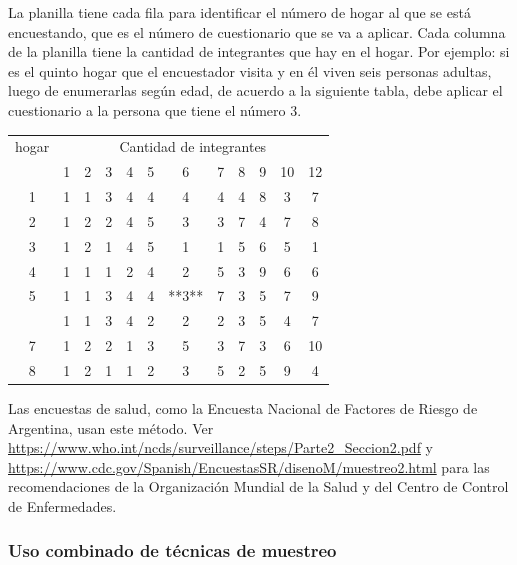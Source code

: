 \documentclass[]{article}
\begin{document}
La planilla tiene cada fila para identificar el número de hogar al que se está encuestando, que es el número de cuestionario que se va a aplicar. Cada columna de la planilla tiene la cantidad de integrantes que hay en el hogar. Por ejemplo: si es el quinto hogar que el encuestador visita y en él viven seis personas adultas, luego de enumerarlas según edad, de acuerdo a la siguiente tabla, debe aplicar el cuestionario a la persona que tiene el número 3.

\begin{table}[H]
\centering
\begin{tabular}{cccccccccccc}
\toprule
\multicolumn{1}{c}{hogar} & \multicolumn{11}{c}{Cantidad de integrantes} \\
\cmidrule(l{3pt}r{3pt}){1-1} \cmidrule(l{3pt}r{3pt}){2-12}
 & 1 & 2 & 3 & 4 & 5 & 6 & 7 & 8 & 9 & 10 & 12\\
\midrule
\rowcolor{gray!6}  1 & 1 & 1 & 3 & 4 & 4 & 4 & 4 & 4 & 8 & 3 & 7\\
2 & 1 & 2 & 2 & 4 & 5 & 3 & 3 & 7 & 4 & 7 & 8\\
\rowcolor{gray!6}  3 & 1 & 2 & 1 & 4 & 5 & 1 & 1 & 5 & 6 & 5 & 1\\
4 & 1 & 1 & 1 & 2 & 4 & 2 & 5 & 3 & 9 & 6 & 6\\
\rowcolor{gray!6}  5 & 1 & 1 & 3 & 4 & 4 & **3** & 7 & 3 & 5 & 7 & 9\\
\addlinespace
6 & 1 & 1 & 3 & 4 & 2 & 2 & 2 & 3 & 5 & 4 & 7\\
\rowcolor{gray!6}  7 & 1 & 2 & 2 & 1 & 3 & 5 & 3 & 7 & 3 & 6 & 10\\
8 & 1 & 2 & 1 & 1 & 2 & 3 & 5 & 2 & 5 & 9 & 4\\
\bottomrule
\end{tabular}
\end{table}

Las encuestas de salud, como la Encuesta Nacional de Factores de Riesgo de Argentina, usan este método. Ver \url{https://www.who.int/ncds/surveillance/steps/Parte2_Seccion2.pdf} y \url{https://www.cdc.gov/Spanish/EncuestasSR/disenoM/muestreo2.html} para las recomendaciones de la Organización Mundial de la Salud y del Centro de Control de Enfermedades.

\hypertarget{uso-combinado-de-tecnicas-de-muestreo}{%
\subsubsection{Uso combinado de técnicas de muestreo}\label{uso-combinado-de-tecnicas-de-muestreo}}
\end{document}
